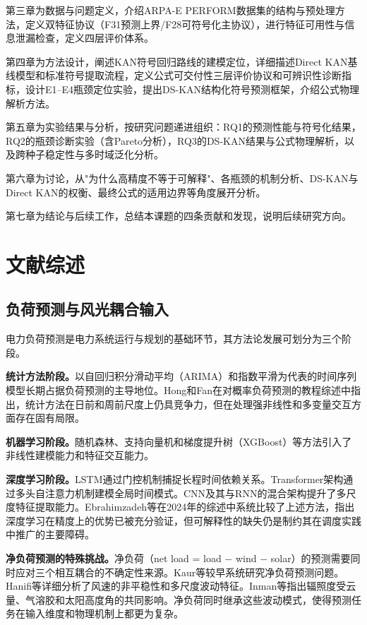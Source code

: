 \documentclass[12pt,a4paper,oneside]{ctexbook}
\begin{document}
第三章为数据与问题定义，介绍ARPA-E PERFORM数据集的结构与预处理方法，定义双特征协议（F31预测上界/F28可符号化主协议），进行特征可用性与信息泄漏检查，定义四层评价体系。

第四章为方法设计，阐述KAN符号回归路线的建模定位，详细描述Direct KAN基线模型和标准符号提取流程，定义公式可交付性三层评价协议和可辨识性诊断指标，设计E1--E4瓶颈定位实验，提出DS-KAN结构化符号预测框架，介绍公式物理解析方法。

第五章为实验结果与分析，按研究问题递进组织：RQ1的预测性能与符号化结果，RQ2的瓶颈诊断实验（含Pareto分析），RQ3的DS-KAN结果与公式物理解析，以及跨种子稳定性与多时域泛化分析。

第六章为讨论，从"为什么高精度不等于可解释"、各瓶颈的机制分析、DS-KAN与Direct KAN的权衡、最终公式的适用边界等角度展开分析。

第七章为结论与后续工作，总结本课题的四条贡献和发现，说明后续研究方向。


\chapter{文献综述}

\section{负荷预测与风光耦合输入}

电力负荷预测是电力系统运行与规划的基础环节，其方法论发展可划分为三个阶段。

\textbf{统计方法阶段。}以自回归积分滑动平均（ARIMA）和指数平滑为代表的时间序列模型长期占据负荷预测的主导地位。Hong和Fan\cite{hong2016probabilistic}在对概率负荷预测的教程综述中指出，统计方法在日前和周前尺度上仍具竞争力，但在处理强非线性和多变量交互方面存在固有局限。

\textbf{机器学习阶段。}随机森林、支持向量机和梯度提升树（XGBoost）等方法引入了非线性建模能力和特征交互能力\cite{wang2023hybrid}。

\textbf{深度学习阶段。}LSTM通过门控机制捕捉长程时间依赖关系\cite{silva2024lstm}。Transformer架构通过多头自注意力机制建模全局时间模式\cite{ebrahimzadeh2024ai}。CNN及其与RNN的混合架构提升了多尺度特征提取能力\cite{wang2023hybrid}。Ebrahimzadeh等\cite{ebrahimzadeh2024ai}在2024年的综述中系统比较了上述方法，指出深度学习在精度上的优势已被充分验证，但可解释性的缺失仍是制约其在调度实践中推广的主要障碍。

\textbf{净负荷预测的特殊挑战。}净负荷（net load = load $-$ wind $-$ solar）的预测需要同时应对三个相互耦合的不确定性来源。Kaur等\cite{kaur2016net}较早系统研究净负荷预测问题。Hanifi等\cite{hanifi2020critical}详细分析了风速的非平稳性和多尺度波动特征。Inman等\cite{inman2013solar}指出辐照度受云量、气溶胶和太阳高度角的共同影响。净负荷同时继承这些波动模式，使得预测任务在输入维度和物理机制上都更为复杂。
\end{document}
